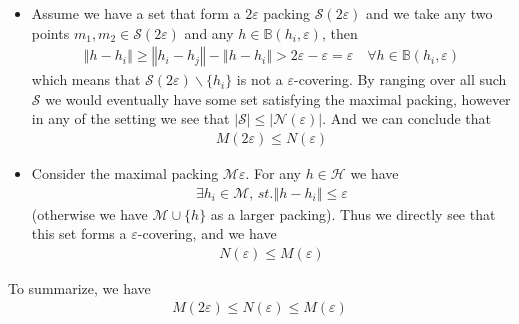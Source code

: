 \documentclass[11pt,a4paper]{ctexart}
\numberwithin{equation}{section}%
\begin{document}
\begin{itemize}[topsep=2pt,itemsep=0pt]
    \item Assume we have a set that form a $ 2\varepsilon  $ packing $ \mathcal{S}(2\varepsilon ) $ and we take any two points $ m_1, m_2 \in \mathcal{S}(2\varepsilon ) $ and any $ h\in \mathbb{B}(h_i,\varepsilon ) $, then
    \begin{align*}
        \left\Vert h-h_i \right\Vert \geq \left\Vert h_i-h_j \right\Vert  - \left\Vert h-h_i \right\Vert > 2 \varepsilon -\varepsilon =\varepsilon \quad\forall h\in \mathbb{B}(h_i,\varepsilon )
    \end{align*}
    which means that $ \mathcal{S}(2\varepsilon )\backslash \{h_i\} $ is not a $ \varepsilon  $-covering. By ranging over all such $ \mathcal{S} $ we would eventually have some set satisfying the maximal packing, however in any of the setting we see that $ \left\vert \mathcal{S} \right\vert \leq \left\vert \mathcal{N}(\varepsilon ) \right\vert $. And we can conclude that
    \begin{align*}
        M(2\varepsilon )\leq N(\varepsilon ) 
    \end{align*}
    \item Consider the maximal packing $ \mathcal{M}{\varepsilon } $. For any $ h\in\mathcal{H} $ we have
    \begin{align*}
        \exists h_i \in\mathcal{M} ,\,st. \left\Vert h-h_i \right\Vert \leq \varepsilon 
    \end{align*}
    (otherwise we have $ \mathcal{M}\cup \{h\} $ as a larger packing). Thus we directly see that this set forms a $ \varepsilon  $-covering, and we have
    \begin{align*}
         N(\varepsilon )\leq M(\varepsilon )
    \end{align*}
    
\end{itemize}

To summarize, we have
\begin{align*}
    M(2\varepsilon )\leq N(\varepsilon ) \leq M(\varepsilon ) 
\end{align*}


\section{}
\end{document}
